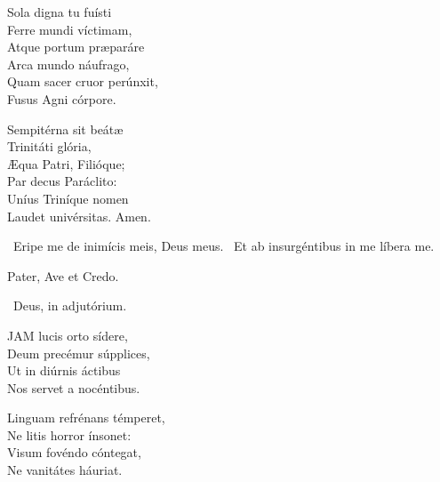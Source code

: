 Sola digna tu fuísti\\
Ferre mundi víctimam,\\
Atque portum præparáre\\
Arca mundo náufrago,\\
Quam sacer cruor perúnxit,\\
Fusus Agni córpore.

Sempitérna sit beátæ\\
Trinitáti glória,\\
Æqua Patri, Filióque;\\
Par decus Paráclito:\\
Uníus Triníque nomen\\
Laudet univérsitas. Amen.

\V\ Eripe me de inimícis meis, Deus meus. \R\ Et ab insurgéntibus in me líbera me.





\sectionornament




Pater, Ave et Credo.

\V\ Deus, in adjutórium.


\lettrine[lines=2]{J}{AM} lucis orto sídere,\\
Deum precémur súpplices,\\
Ut in diúrnis áctibus\\
Nos servet a nocéntibus.

Linguam refrénans témperet,\\
Ne litis horror ínsonet:\\
Visum fovéndo cóntegat,\\
Ne vanitátes háuriat.

